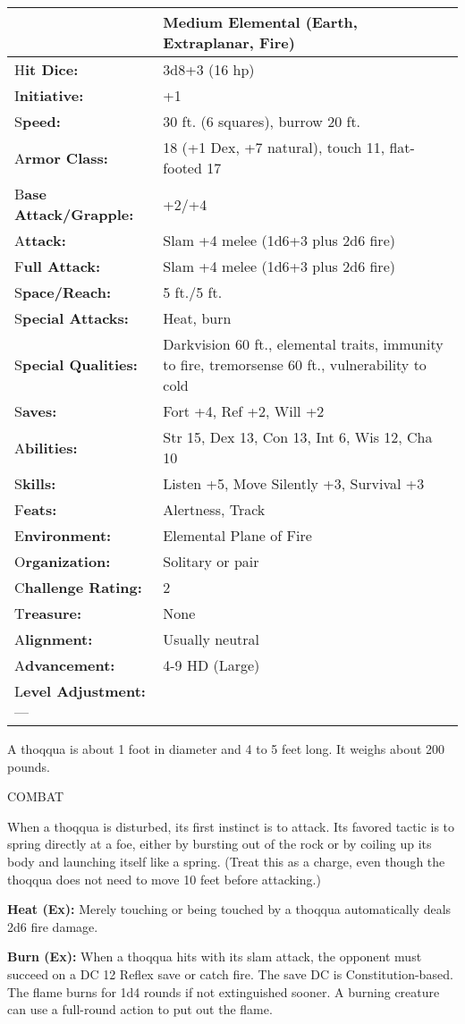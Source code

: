 \documentclass{article}
\begin{document}
\begin{tabular}{|>{\raggedright}p{91pt}|>{\raggedright}p{213pt}|}
\hline
  & Medium Elemental (Earth, Extraplanar, Fire)\tabularnewline
\hline
H\textbf{it Dice:} & 3d8+3 (16 hp)\tabularnewline
\hline
I\textbf{nitiative:} & +1\tabularnewline
\hline
S\textbf{peed:} & 30 ft. (6 squares), burrow 20 ft.\tabularnewline
\hline
A\textbf{rmor Class:} & 18 (+1 Dex, +7 natural), touch 11, flat-footed 17\tabularnewline
\hline
B\textbf{ase Attack/Grapple:} & +2/+4\tabularnewline
\hline
A\textbf{ttack:} & Slam +4 melee (1d6+3 plus 2d6 fire)\tabularnewline
\hline
F\textbf{ull Attack:} & Slam +4 melee (1d6+3 plus 2d6 fire)\tabularnewline
\hline
S\textbf{pace/Reach:} & 5 ft./5 ft.\tabularnewline
\hline
S\textbf{pecial Attacks:} & Heat, burn\tabularnewline
\hline
S\textbf{pecial Qualities:} & Darkvision 60 ft., elemental traits, immunity to 
fire, tremorsense 60 ft., vulnerability to cold\tabularnewline
\hline
S\textbf{aves:} & Fort +4, Ref +2, Will +2\tabularnewline
\hline
A\textbf{bilities:} & Str 15, Dex 13, Con 13, Int 6, Wis 12, Cha 10\tabularnewline
\hline
S\textbf{kills:} & Listen +5, Move Silently +3, Survival +3\tabularnewline
\hline
F\textbf{eats:} & Alertness, Track\tabularnewline
\hline
E\textbf{nvironment:} & Elemental Plane of Fire\tabularnewline
\hline
O\textbf{rganization:} & Solitary or pair\tabularnewline
\hline
C\textbf{hallenge Rating:} & 2\tabularnewline
\hline
T\textbf{reasure:} & None\tabularnewline
\hline
A\textbf{lignment:} & Usually neutral\tabularnewline
\hline
A\textbf{dvancement:} & 4-9 HD (Large)\tabularnewline
\hline
L\textbf{evel Adjustment:}--- & \tabularnewline
\hline
\end{tabular}

A thoqqua is about 1 foot in diameter and 4 to 5 feet long. It weighs about 200 
pounds.

COMBAT

When a thoqqua is disturbed, its first instinct is to attack. Its favored tactic 
is to spring directly at a foe, either by bursting out of the rock or by coiling 
up its body and launching itself like a spring. (Treat this as a charge, even though 
the thoqqua does not need to move 10 feet before attacking.)

\textbf{Heat (Ex): }Merely touching or being touched by a thoqqua automatically 
deals 2d6 fire damage.

\textbf{Burn (Ex):} When a thoqqua hits with its slam attack, the opponent must 
succeed on a DC 12 Reflex save or catch fire. The save DC is Constitution-based. 
The flame burns for 1d4 rounds if not extinguished sooner. A burning creature can 
use a full-round action to put out the flame.
\end{document}
